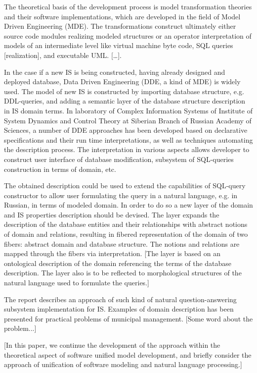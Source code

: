 \documentclass[conference]{IEEEtran}
\newcommand{\e}[2][fcolor]{\textcolor{pcolor}{[}\textcolor{#1}{#2}\textcolor{pcolor}{]}}
\begin{document}
The theoretical basis of the development process is model transformation theories and their software implementations, which are developed in the field of Model Driven Engineering (MDE).  The transformations construct ultimately either source code modules realizing modeled structures or an operator interpretation of models of an intermediate level like virtual machine byte code, SQL queries \e{realization}, and executable UML. \e{\ldots{}}.

In the case if a new IS is being constructed, having already designed and deployed database, Data Driven Engineering (DDE, a kind of MDE) is widely used.  The model of new IS is constructed by importing database structure, e.g. DDL-queries, and adding a semantic layer of the database structure description in IS domain terms.  In laboratory of Complex Information Systems of Institute of System Dynamics and Control Theory at Siberian Branch of Russian Academy of Sciences, a number of DDE approaches has been developed based on declarative specifications and their run time interpretations, as well as techniques automating the description process.  The interpretation in various aspects allows developer to construct user interface of database modification, subsystem of SQL-queries construction in terms of domain, etc.

The obtained description could be used to extend the capabilities of SQL-query constructor to allow user formulating the query in a natural language, e.g. in Russian, in terms of modeled domain.  In order to do so a new layer of the domain and IS properties description should be devised.  The layer expands the description of the database entities and their relationships with abstract notions of domain and relations, resulting in fibered representation of the domain of two fibers: abstract domain and database structure.  The notions and relations are mapped through the fibers via interpretation.  \e{The layer is based on an ontological description of the domain referencing the terms of the database description.  The layer also is to be reflected to morphological structures of the natural language used to formulate the queries.}

The report describes an approach of such kind of natural question-answering subsystem implementation for IS.  Examples of domain description has been presented for practical problems of municipal management. \e{Some word about the problem...}

\e{In this paper, we continue the development of the approach
\cite{fereferovDiss} within the theoretical aspect \cite{b2:15} of software unified model development, and briefly consider the approach of unification of software modeling and natural language processing.}
\end{document}
